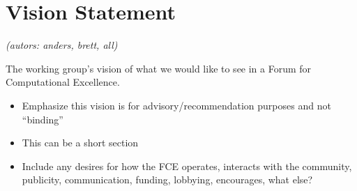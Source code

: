 \section{Vision Statement}

\textit{(autors: anders, brett, all)}

The working group's vision of what we would like to see in a Forum for
Computational Excellence.

\begin{itemize}
\item Emphasize this vision is for advisory/recommendation purposes and not  ``binding''
\item This can be a short section
\item Include any desires for how the FCE operates, interacts with the community, publicity, communication, funding, lobbying, encourages, what else?
\end{itemize}
